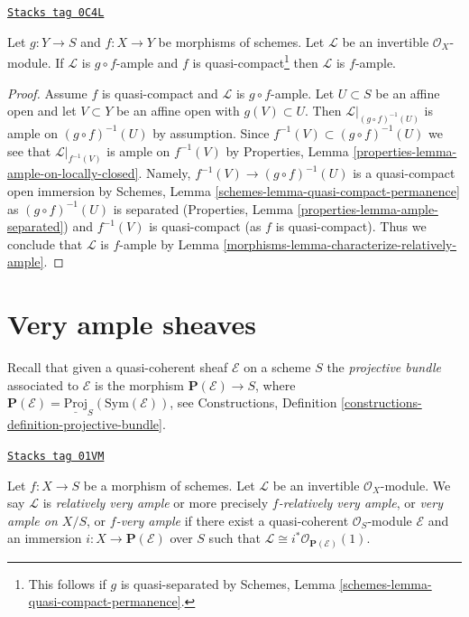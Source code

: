 \begin{lemma}
\label{morphisms-lemma-ample-permanence}
\href{https://stacks.math.columbia.edu/tag/0C4L}{\texttt{Stacks tag 0C4L}}

Let $g : Y \to S$ and $f : X \to Y$ be morphisms of schemes.
Let $\mathcal{L}$ be an invertible $\mathcal{O}_X$-module.
If $\mathcal{L}$ is $g \circ f$-ample and $f$ is
quasi-compact\footnote{This follows if $g$ is quasi-separated by
Schemes, Lemma \ref{schemes-lemma-quasi-compact-permanence}.}
then $\mathcal{L}$ is $f$-ample.
\end{lemma}

\begin{proof}

Assume $f$ is quasi-compact and $\mathcal{L}$ is $g \circ f$-ample.
Let $U \subset S$ be an affine open and let $V \subset Y$ be
an affine open with $g(V) \subset U$.
Then $\mathcal{L}|_{(g \circ f)^{-1}(U)}$ is ample on
$(g \circ f)^{-1}(U)$ by assumption.
Since $f^{-1}(V) \subset (g \circ f)^{-1}(U)$ we see that
$\mathcal{L}|_{f^{-1}(V)}$ is ample on $f^{-1}(V)$ by
Properties, Lemma \ref{properties-lemma-ample-on-locally-closed}.
Namely, $f^{-1}(V) \to (g \circ f)^{-1}(U)$ is a quasi-compact
open immersion by
Schemes, Lemma \ref{schemes-lemma-quasi-compact-permanence}
as $(g \circ f)^{-1}(U)$ is separated
(Properties, Lemma \ref{properties-lemma-ample-separated})
and $f^{-1}(V)$ is quasi-compact (as $f$ is quasi-compact).
Thus we conclude that $\mathcal{L}$ is $f$-ample by
Lemma \ref{morphisms-lemma-characterize-relatively-ample}.
\end{proof}

\section{Very ample sheaves}
\label{morphisms-section-very-ample}
Recall that given a quasi-coherent sheaf $\mathcal{E}$ on a scheme
$S$ the {\it projective bundle} associated to $\mathcal{E}$ is the morphism
$\mathbf{P}(\mathcal{E}) \to S$, where
$\mathbf{P}(\mathcal{E}) = \underline{\text{Proj}}_S(\text{Sym}(\mathcal{E}))$,
see
Constructions, Definition \ref{constructions-definition-projective-bundle}.

\begin{definition}
\label{morphisms-definition-very-ample}
\href{https://stacks.math.columbia.edu/tag/01VM}{\texttt{Stacks tag 01VM}}

Let $f : X \to S$ be a morphism of schemes.
Let $\mathcal{L}$ be an invertible $\mathcal{O}_X$-module.
We say $\mathcal{L}$ is {\it relatively very ample} or more
precisely {\it $f$-relatively very ample}, or
{\it very ample on $X/S$}, or {\it $f$-very ample} if
there exist a quasi-coherent $\mathcal{O}_S$-module
$\mathcal{E}$ and an immersion $i : X \to \mathbf{P}(\mathcal{E})$
over $S$ such that
$\mathcal{L} \cong i^*\mathcal{O}_{\mathbf{P}(\mathcal{E})}(1)$.
\end{definition}


